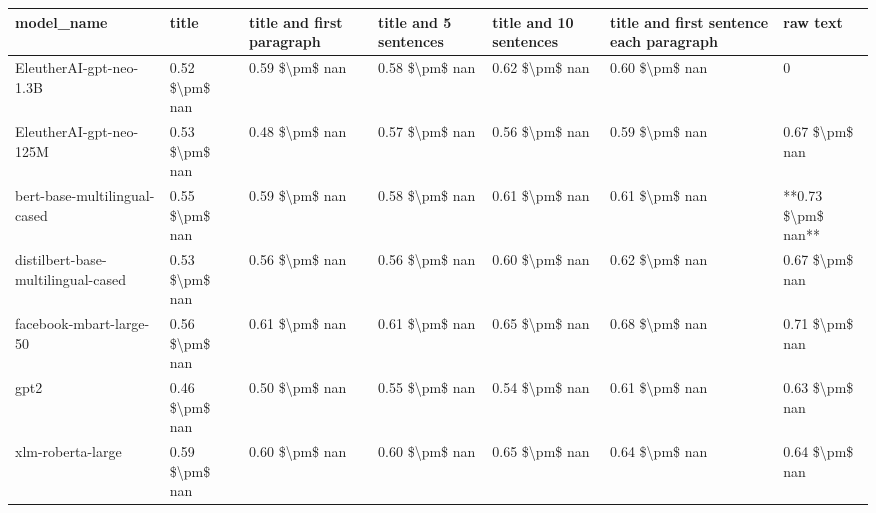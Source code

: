 \begin{tabular}{lllllll}
\toprule
                        model\_name &          title & title and first paragraph & title and 5 sentences & title and 10 sentences & title and first sentence each paragraph &           raw text \\
\midrule
           EleutherAI-gpt-neo-1.3B & 0.52 \$\textbackslash pm\$ nan &            0.59 \$\textbackslash pm\$ nan &        0.58 \$\textbackslash pm\$ nan &         0.62 \$\textbackslash pm\$ nan &                          0.60 \$\textbackslash pm\$ nan &                  0 \\
           EleutherAI-gpt-neo-125M & 0.53 \$\textbackslash pm\$ nan &            0.48 \$\textbackslash pm\$ nan &        0.57 \$\textbackslash pm\$ nan &         0.56 \$\textbackslash pm\$ nan &                          0.59 \$\textbackslash pm\$ nan &     0.67 \$\textbackslash pm\$ nan \\
      bert-base-multilingual-cased & 0.55 \$\textbackslash pm\$ nan &            0.59 \$\textbackslash pm\$ nan &        0.58 \$\textbackslash pm\$ nan &         0.61 \$\textbackslash pm\$ nan &                          0.61 \$\textbackslash pm\$ nan & **0.73 \$\textbackslash pm\$ nan** \\
distilbert-base-multilingual-cased & 0.53 \$\textbackslash pm\$ nan &            0.56 \$\textbackslash pm\$ nan &        0.56 \$\textbackslash pm\$ nan &         0.60 \$\textbackslash pm\$ nan &                          0.62 \$\textbackslash pm\$ nan &     0.67 \$\textbackslash pm\$ nan \\
           facebook-mbart-large-50 & 0.56 \$\textbackslash pm\$ nan &            0.61 \$\textbackslash pm\$ nan &        0.61 \$\textbackslash pm\$ nan &         0.65 \$\textbackslash pm\$ nan &                          0.68 \$\textbackslash pm\$ nan &     0.71 \$\textbackslash pm\$ nan \\
                              gpt2 & 0.46 \$\textbackslash pm\$ nan &            0.50 \$\textbackslash pm\$ nan &        0.55 \$\textbackslash pm\$ nan &         0.54 \$\textbackslash pm\$ nan &                          0.61 \$\textbackslash pm\$ nan &     0.63 \$\textbackslash pm\$ nan \\
                 xlm-roberta-large & 0.59 \$\textbackslash pm\$ nan &            0.60 \$\textbackslash pm\$ nan &        0.60 \$\textbackslash pm\$ nan &         0.65 \$\textbackslash pm\$ nan &                          0.64 \$\textbackslash pm\$ nan &     0.64 \$\textbackslash pm\$ nan \\
\bottomrule
\end{tabular}
